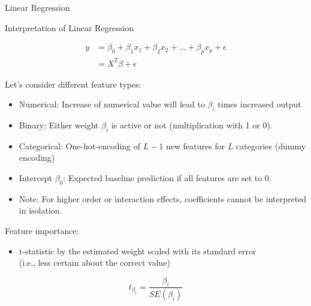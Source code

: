 \documentclass[11pt,compress,t,notes=noshow, aspectratio=169, xcolor=table]{beamer}
\begin{document}
\begin{frame}[c]{Linear Regression}
\end{frame}


\begin{frame}[c]{Interpretation of Linear Regression}

\begin{align*}
y &= \beta_0 + \beta_1 x_1 + \beta_2 x_2 + \dots + \beta_p x_p + \epsilon \\
 &= X^T\beta + \epsilon
\end{align*}

    Let's consider different feature types:
    \begin{itemize}
        \item Numerical: Increase of numerical value will lead to $\beta_i$ times increased output
        \item Binary: Either weight $\beta_i$ is active or not (multiplication with 1 or 0).
        \item Categorical: One-hot-encoding of $L-1$ new features for $L$ categories (dummy encoding)
        \item Intercept $\beta_0$: Expected baseline prediction if all features are set to 0. %
        \item Note: For higher order or interaction effects, coefficients cannot be interpreted in isolation.
    \end{itemize}	
    \pause
    Feature importance:
    \begin{itemize}
        \item t-statistic by the estimated weight scaled with its standard error\\ (i.e., less certain about the correct value)
    \end{itemize}
    $$t_{\beta_i} = \frac{\beta_i}{SE(\beta_i)} $$
\end{frame}



\end{document}
